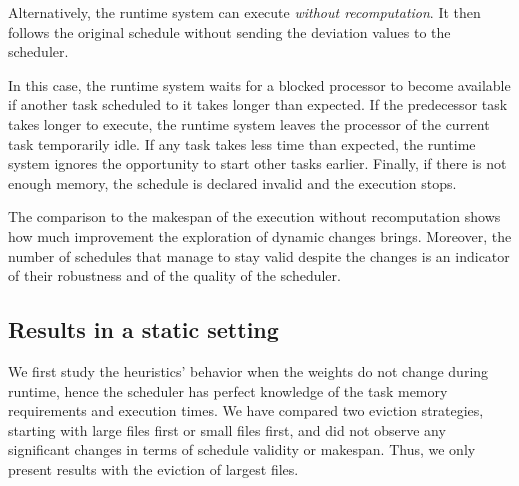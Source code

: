 \documentclass[conference]{IEEEtran}
\newcommand{\new}[1]{{\color{blue}#1}}
\begin{document}
\new{Alternatively, the runtime system can execute \textit{without recomputation}.
It then follows the original schedule without sending the deviation values to the scheduler.

In this case, the runtime system waits for a blocked processor to become available if another task scheduled to it takes longer than expected.
If the predecessor task takes longer to execute, the runtime system leaves the processor of the current task
temporarily idle.
If any task takes less time than expected, the runtime system ignores the opportunity to start other tasks earlier.
Finally, if there is not enough memory, the schedule is declared invalid and the execution stops.

The comparison to the makespan of the execution without recomputation shows how much improvement the exploration of dynamic
changes brings.
Moreover, the number of schedules that manage to stay valid despite the changes is an indicator of their robustness and of the quality of the scheduler.}

\subsection{Results in a static setting}
\label{sec.expe.static}
%
We first study the heuristics' behavior when the weights do not change during runtime,
hence the scheduler has perfect knowledge of the task memory requirements and execution times.
We have compared two eviction strategies, starting with large files first or small files first,
and did not observe any significant changes in terms of schedule validity or makespan.
Thus, we only present results with the eviction of largest files. %

\end{document}

